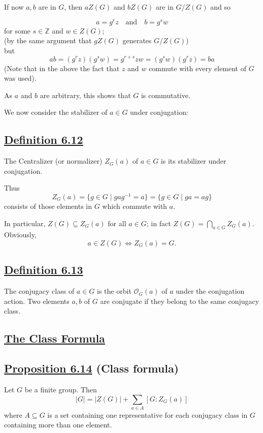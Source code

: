 If now $a, b$ are in $G$, then $aZ(G)$ and $bZ(G)$ are in $G/Z(G)$ and so


\[
a = g^r z \quad \text{and} \quad b = g^s w
\]
for some $s \in \mathbb{Z}$ and $w \in Z(G)$; \\
(by the same argument that $gZ(G)$ generates $G/Z(G)$) \\
but
\[
ab = (g^r z)(g^s w) = g^{r+s} zw = (g^s w)(g^r z) = ba
\]
(Note that in the above the fact that $z$ and $w$ commute with every element of $G$ was used).

As $a$ and $b$ are arbitrary, this shows that $G$ is commutative.

\vspace{1.5em}

We now consider the stabilizer of $a \in G$ under conjugation:

\vspace{1.5em}

\subsection*{\underline{Definition 6.12}}
The Centralizer (or normalizer) $Z_G(a)$ of $a \in G$ is its stabilizer under conjugation.

Thus
\[
Z_G(a) = \{g \in G \mid gag^{-1} = a\} = \{g \in G \mid ga = ag\}
\]
consists of those elements in $G$ which commute with \underline{$a$}.

\vspace{2em}

In particular, $Z(G) \subseteq Z_G(a)$ for all $a \in G$; in fact $Z(G) = \bigcap_{a \in G} Z_G(a)$. Obviously,
\[
a \in Z(G) \iff Z_G(a) = G.
\]


\subsection*{\underline{Definition 6.13}}
The conjugacy class of $a \in G$ is the orbit $\mathcal{O}_G(a)$ of $a$ under the conjugation action. Two elements $a, b$ of $G$ are conjugate if they belong to the same conjugacy class.

\vspace{1.5em}

\subsection*{\underline{The Class Formula}}

\subsection*{\underline{Proposition 6.14} (Class formula)}
Let $G$ be a finite group. Then
\[
|G| = |Z(G)| + \sum_{a \in A} [G : Z_G(a)]
\]
where $A \subseteq G$ is a set containing one representative for each conjugacy class in $G$ containing more than one element.


